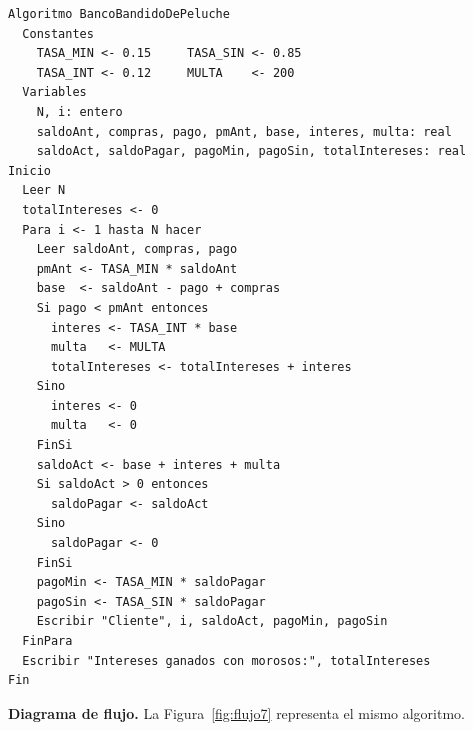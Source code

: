 \documentclass[12pt,a4paper]{article}
\begin{document}
\begin{lstlisting}[caption={Pseudocódigo del ejercicio 7.}, label={lst:pseudo7}]
Algoritmo BancoBandidoDePeluche
  Constantes
    TASA_MIN <- 0.15     TASA_SIN <- 0.85
    TASA_INT <- 0.12     MULTA    <- 200
  Variables
    N, i: entero
    saldoAnt, compras, pago, pmAnt, base, interes, multa: real
    saldoAct, saldoPagar, pagoMin, pagoSin, totalIntereses: real
Inicio
  Leer N
  totalIntereses <- 0
  Para i <- 1 hasta N hacer
    Leer saldoAnt, compras, pago
    pmAnt <- TASA_MIN * saldoAnt
    base  <- saldoAnt - pago + compras
    Si pago < pmAnt entonces
      interes <- TASA_INT * base
      multa   <- MULTA
      totalIntereses <- totalIntereses + interes
    Sino
      interes <- 0
      multa   <- 0
    FinSi
    saldoAct <- base + interes + multa
    Si saldoAct > 0 entonces
      saldoPagar <- saldoAct
    Sino
      saldoPagar <- 0
    FinSi
    pagoMin <- TASA_MIN * saldoPagar
    pagoSin <- TASA_SIN * saldoPagar
    Escribir "Cliente", i, saldoAct, pagoMin, pagoSin
  FinPara
  Escribir "Intereses ganados con morosos:", totalIntereses
Fin
\end{lstlisting}

\textbf{Diagrama de flujo.} La Figura~\ref{fig:flujo7} representa el mismo algoritmo.
\end{document}
